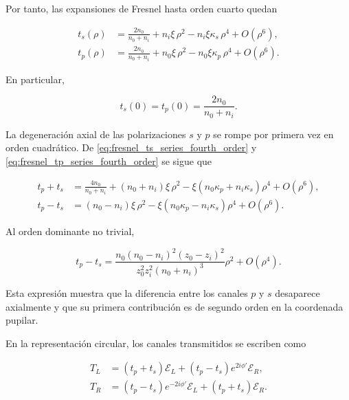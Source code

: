 Por tanto, las expansiones de Fresnel hasta orden cuarto quedan

\begin{align}
t_s(\rho)
&=
\frac{2n_0}{n_0+n_i}
+
n_i\xi\,\rho^2
-
n_i\xi\kappa_s\,\rho^4
+
O(\rho^6),
\label{eq:fresnel_ts_series_fourth_order}
\\[6pt]
t_p(\rho)
&=
\frac{2n_0}{n_0+n_i}
+
n_0\xi\,\rho^2
-
n_0\xi\kappa_p\,\rho^4
+
O(\rho^6).
\label{eq:fresnel_tp_series_fourth_order}
\end{align}

En particular,

\begin{equation}
t_s(0)=t_p(0)=\frac{2n_0}{n_0+n_i}.
\label{eq:fresnel_axis_degeneracy}
\end{equation}

La degeneración axial de las polarizaciones \(s\) y \(p\) se rompe por primera vez en orden cuadrático. De \eqref{eq:fresnel_ts_series_fourth_order} y \eqref{eq:fresnel_tp_series_fourth_order} se sigue que

\begin{align}
t_p+t_s
&=
\frac{4n_0}{n_0+n_i}
+
(n_0+n_i)\xi\,\rho^2
-
\xi(n_0\kappa_p+n_i\kappa_s)\rho^4
+
O(\rho^6),
\label{eq:tp_plus_ts_series_fourth_order}
\\[8pt]
t_p-t_s
&=
(n_0-n_i)\xi\,\rho^2
-
\xi(n_0\kappa_p-n_i\kappa_s)\rho^4
+
O(\rho^6).
\label{eq:tp_minus_ts_series_fourth_order}
\end{align}

Al orden dominante no trivial,

\begin{equation}
t_p-t_s
=
\frac{
n_0(n_0-n_i)^2(z_0-z_i)^2
}{
z_0^2z_i^2(n_0+n_i)^3
}
\rho^2
+
O(\rho^4).
\label{eq:tp_minus_ts_quadratic_explicit}
\end{equation}

Esta expresión muestra que la diferencia entre los canales \(p\) y \(s\) desaparece axialmente y que su primera contribución es de segundo orden en la coordenada pupilar.

En la representación circular, los canales transmitidos se escriben como

\begin{align}
T_L
&=
(t_p+t_s)\mathscr E_L
+
(t_p-t_s)e^{2i\phi'}\mathscr E_R,
\label{eq:TL_exact_circular}
\\[6pt]
T_R
&=
(t_p-t_s)e^{-2i\phi'}\mathscr E_L
+
(t_p+t_s)\mathscr E_R.
\label{eq:TR_exact_circular}
\end{align}

